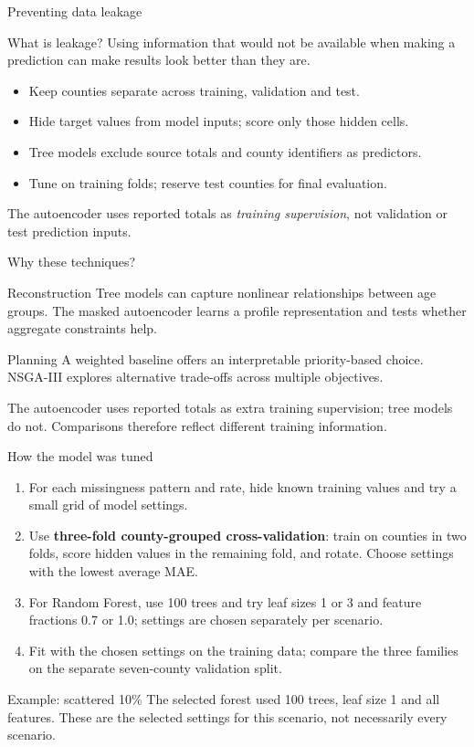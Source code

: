 \documentclass[aspectratio=169,11pt]{beamer}
\begin{document}
\begin{frame}{Preventing data leakage}
  \begin{block}{What is leakage?}
    Using information that would not be available when making a prediction
    can make results look better than they are.
  \end{block}
  \begin{itemize}
    \item Keep counties separate across training, validation and test.
    \item Hide target values from model inputs; score only those hidden cells.
    \item Tree models exclude source totals and county identifiers as predictors.
    \item Tune on training folds; reserve test counties for final evaluation.
  \end{itemize}
  \small The autoencoder uses reported totals as \emph{training supervision},
  not validation or test prediction inputs.
\end{frame}

\begin{frame}{Why these techniques?}
  \begin{block}{Reconstruction}
    Tree models can capture nonlinear relationships between age groups. The masked
    autoencoder learns a profile representation and tests whether aggregate constraints help.
  \end{block}
  \begin{block}{Planning}
    A weighted baseline offers an interpretable priority-based choice. NSGA-III explores
    alternative trade-offs across multiple objectives.
  \end{block}
  \small The autoencoder uses reported totals as extra training supervision; tree models do not.
  Comparisons therefore reflect different training information.
\end{frame}

\begin{frame}{How the model was tuned}
  \small
  \begin{enumerate}
    \item For each missingness pattern and rate, hide known training values and
    try a small grid of model settings.
    \item Use \textbf{three-fold county-grouped cross-validation}: train on
    counties in two folds, score hidden values in the remaining fold, and
    rotate. Choose settings with the lowest average MAE.
    \item For Random Forest, use 100 trees and try leaf sizes 1 or 3 and
    feature fractions 0.7 or 1.0; settings are chosen separately per scenario.
    \item Fit with the chosen settings on the training data; compare the three
    families on the separate seven-county validation split.
  \end{enumerate}
  \begin{block}{Example: scattered 10\%}
    The selected forest used 100 trees, leaf size 1 and all features.
    These are the selected settings for this scenario, not necessarily every scenario.
  \end{block}
\end{frame}
\end{document}
